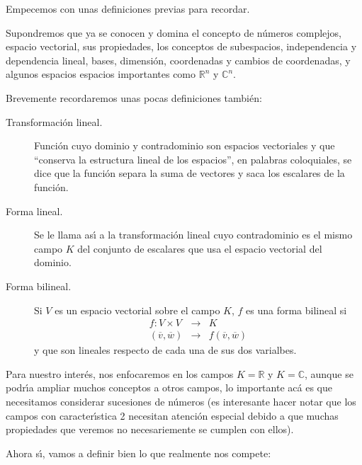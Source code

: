 \documentclass[a4paper,11pt]{article}
\theoremstyle{teoremas}
\theoremstyle{ejemplos}
\theoremstyle{definiciones}
\theoremstyle{lemas}
\begin{document}
Empecemos con unas definiciones previas para recordar.
\par 
Supondremos que ya se conocen y domina el concepto de n\'umeros complejos, espacio vectorial, sus propiedades, los conceptos de subespacios, independencia y dependencia lineal, bases, dimensi\'on, coordenadas y cambios de coordenadas, y algunos espacios espacios importantes como $\mathbb{R}^n$ y $\mathbb{C}^n$.
\par 
Brevemente recordaremos unas pocas definiciones tambi\'en:
\begin{description}
 \item[Transformaci\'on lineal.] Funci\'on cuyo dominio y contradominio son espacios vectoriales y que ``conserva la estructura lineal de los espacios'', en palabras coloquiales, se dice que la funci\'on separa la suma de vectores y saca los escalares de la funci\'on.
 \item[Forma lineal.] Se le llama as\'{\i} a la transformaci\'on lineal cuyo contradominio es el mismo campo $K$ del conjunto de escalares que usa el espacio vectorial del dominio.
 \item[Forma bilineal.] Si $V$ es un espacio vectorial sobre el campo $K$, $f$ es una forma bilineal si
 \begin{eqnarray*}
  f: V\times V                 & \rightarrow & K \\
  (\overline{v}, \overline{w}) & \rightarrow & f(\overline{v}, \overline{w})
 \end{eqnarray*}
 y que son lineales respecto de cada una de sus dos varialbes.
\end{description}
\par
Para nuestro inter\'es, nos enfocaremos en los campos $K=\mathbb{R}$ y $K=\mathbb{C}$, aunque se podr\'{\i}a ampliar muchos conceptos a otros campos, lo importante ac\'a es que necesitamos considerar sucesiones de n\'umeros (es interesante hacer notar que los campos con caracter\'{\i}stica 2 necesitan atenci\'on especial debido a que muchas propiedades que veremos no necesariemente se cumplen con ellos).
\par 
Ahora s\'{\i}, vamos a definir bien lo que realmente nos compete:
\end{document}
